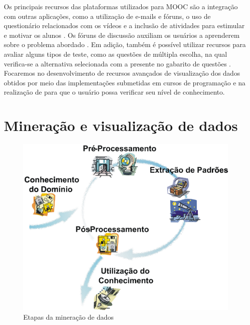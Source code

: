 		Os principais recursos das plataformas utilizados para \acs{MOOC} são a integração
		com outras aplicações, como a utilização de e-mails e fóruns, o uso de questionário
		relacionados com os vídeos e a inclusão de atividades para estimular e motivar
		os alunos \cite{fassbinder2014}. Os fóruns de discussão auxiliam os usuários
		a aprenderem sobre o problema abordado \cite{schmidt2013producing}.
		Em adição, também é possível utilizar recursos para avaliar alguns tipos de
		teste, como as questões de múltipla escolha, na qual verifica-se a alternativa
		selecionada com a presente no gabarito de questões \cite{alario2013analysing}.
		Focaremos no desenvolvimento de recursos avançados de visualização dos dados
		obtidos por meio das implementações submetidas em cursos de programação e na
		realização de  para que o usuário possa verificar seu
		nível de conhecimento.

	\section{Mineração e visualização de dados}
	\label{sec:FundTeor}
		
		\begin{figure}[b]
			\centering
			\includegraphics[width=0.6\linewidth]{imagem/mineracaoDados}
			\caption[Etapas da mineração de dados]{Etapas da mineração de dados \cite{rezende2003}}
			\label{fig:mineracaoDados}
		\end{figure}
		
